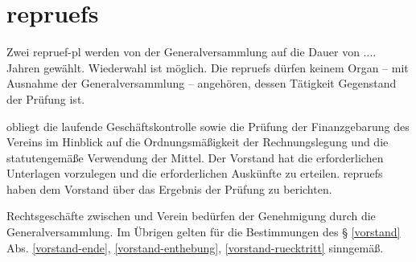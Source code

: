 \documentclass{article}
\begin{document}
\section{\glspl{repruef}}\label{rechnungspruefung}
\begin{absatz}
    \item Zwei \gls{repruef-pl} werden von der Generalversammlung auf die Dauer von
    .... Jahren gewählt. Wiederwahl ist möglich. Die \glspl{repruef} dürfen keinem Organ – mit Ausnahme der Generalversammlung – angehören, dessen Tätigkeit Gegenstand der Prüfung ist.
    \item {} obliegt die laufende Geschäftskontrolle sowie die Prüfung der Finanzgebarung des Vereins im Hinblick auf die Ordnungsmäßigkeit der Rechnungslegung und die statutengemäße Verwendung der Mittel. Der Vorstand hat  die erforderlichen Unterlagen vorzulegen und die erforderlichen Auskünfte zu erteilen. \Glspl{repruef} haben dem Vorstand über das Ergebnis der Prüfung zu berichten.
    \item Rechtsgeschäfte zwischen  und Verein bedürfen der Genehmigung durch die Generalversammlung. Im Übrigen gelten für  die Bestimmungen des § \ref{vorstand} Abs. \ref{vorstand-ende}, \ref{vorstand-enthebung}, \ref{vorstand-ruecktritt} sinngemäß.
\end{absatz}
\end{document}
